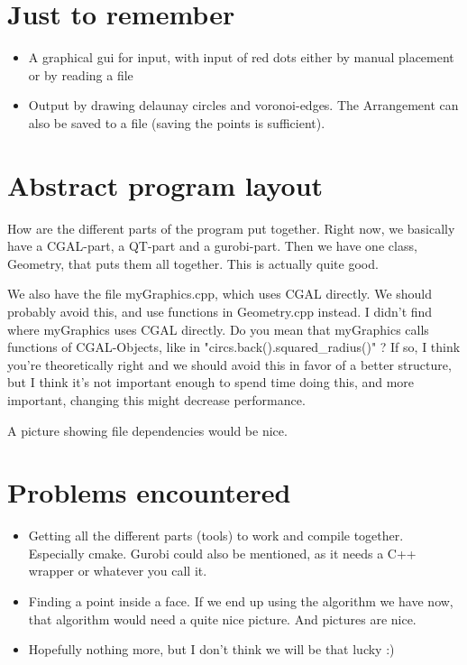 \documentclass[a4paper,12pt]{article}
\begin{document}
\section{Just to remember}
\begin{itemize}
\item
A graphical gui for input, with input of red dots either by manual placement or by reading a file
\item
Output by drawing delaunay circles and voronoi-edges.
The Arrangement can also be saved to a file (saving the points is sufficient).

\end{itemize}


\section{Abstract program layout}
How are the different parts of the program put together. Right now, we basically have a CGAL-part, a QT-part and a gurobi-part. Then we have one class, Geometry, that puts them all together. This is actually quite good.

We also have the file myGraphics.cpp, which uses CGAL directly. We should probably avoid this, and use functions in Geometry.cpp instead.
I didn't find where myGraphics uses CGAL directly. Do you mean that myGraphics calls functions of CGAL-Objects, like in "circs.back().squared\_radius()" ?
If so, I think you're theoretically right and we should avoid this in favor of a better structure, but I think it's not important enough to spend time doing this, and more important, changing this might decrease performance.

A picture showing file dependencies would be nice.

\section{Problems encountered}
\begin{itemize}
\item
Getting all the different parts (tools) to work and compile together. Especially cmake. Gurobi could also be mentioned, as it needs a C++ wrapper or whatever you call it.
\item
Finding a point inside a face. If we end up using the algorithm we have now, that algorithm would need a quite nice picture. And pictures are nice.
\item
Hopefully nothing more, but I don't think we will be that lucky :)
\end{itemize}
\end{document}
